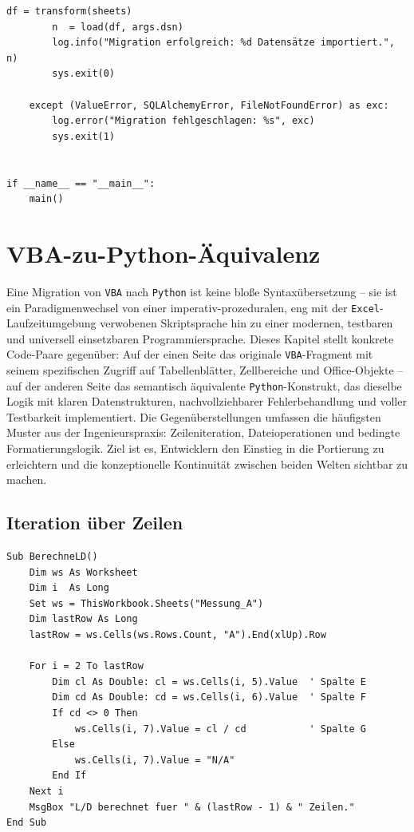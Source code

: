 ﻿\documentclass[12pt,a4paper]{report}
\theoremstyle{definition}
\theoremstyle{remark}
\newcommand{\excel}{\texttt{Excel}}
\newcommand{\vba}{\texttt{VBA}}
\newcommand{\py}{\texttt{Python}}
\begin{document}
\begin{lstlisting}[style=python, caption={migrate.py: Vollständige ETL-Pipeline}, label=lst:etl]
        df = transform(sheets)
        n  = load(df, args.dsn)
        log.info("Migration erfolgreich: %d Datensätze importiert.", n)
        sys.exit(0)

    except (ValueError, SQLAlchemyError, FileNotFoundError) as exc:
        log.error("Migration fehlgeschlagen: %s", exc)
        sys.exit(1)


if __name__ == "__main__":
    main()
\end{lstlisting}

\chapter{VBA-zu-Python-Äquivalenz}

Eine Migration von \vba{} nach \py{} ist keine bloße Syntaxübersetzung -- sie ist ein Paradigmenwechsel von einer imperativ-prozeduralen, eng mit der \excel{}-Laufzeitumgebung verwobenen Skriptsprache hin zu einer modernen, testbaren und universell einsetzbaren Programmiersprache. Dieses Kapitel stellt konkrete Code-Paare gegenüber: Auf der einen Seite das originale \vba{}-Fragment mit seinem spezifischen Zugriff auf Tabellenblätter, Zellbereiche und Office-Objekte -- auf der anderen Seite das semantisch äquivalente \py{}-Konstrukt, das dieselbe Logik mit klaren Datenstrukturen, nachvollziehbarer Fehlerbehandlung und voller Testbarkeit implementiert. Die Gegenüberstellungen umfassen die häufigsten Muster aus der Ingenieurspraxis: Zeileniteration, Dateioperationen und bedingte Formatierungslogik. Ziel ist es, Entwicklern den Einstieg in die Portierung zu erleichtern und die konzeptionelle Kontinuität zwischen beiden Welten sichtbar zu machen.

\section{Iteration über Zeilen}

\begin{lstlisting}[style=vba, caption={VBA: Iteration mit For Each}]
Sub BerechneLD()
    Dim ws As Worksheet
    Dim i  As Long
    Set ws = ThisWorkbook.Sheets("Messung_A")
    Dim lastRow As Long
    lastRow = ws.Cells(ws.Rows.Count, "A").End(xlUp).Row

    For i = 2 To lastRow
        Dim cl As Double: cl = ws.Cells(i, 5).Value  ' Spalte E
        Dim cd As Double: cd = ws.Cells(i, 6).Value  ' Spalte F
        If cd <> 0 Then
            ws.Cells(i, 7).Value = cl / cd           ' Spalte G
        Else
            ws.Cells(i, 7).Value = "N/A"
        End If
    Next i
    MsgBox "L/D berechnet fuer " & (lastRow - 1) & " Zeilen."
End Sub
\end{lstlisting}
\end{document}
